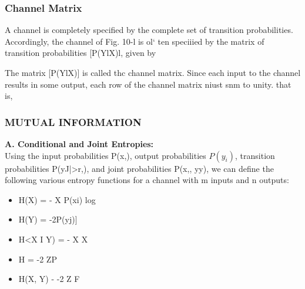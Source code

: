 \documentclass[a4]{beamer}
\begin{document}
\begin{frame}
\frametitle{ Channel Matrix}

A channel is completely specified by the complete set of transition probabilities. Accordingly, the
channel of Fig. 10-l is ol` ten speciiied by the matrix of transition probabilities [P(YlX)l, given by

The matrix [P(YlX)] is called thc channel matrix. Since each input to the channel results in some
output, each row of the channel matrix niust snm to unity. that is,
 \end{frame}


\begin{frame}
\frametitle{ MUTUAL INFORMATION}
\textbf{A. Conditional and Joint Entropies:}\\
Using the input probabilities P(x,), output probabilities $P(y_i)$, transition probabilities P(yJ|>r,),
and joint probabilities P(x,, yy), we can define the following various entropy functions for a channel
with m inputs and n outputs:
 
\begin{itemize}
\item H(X) = - X P(xi) log %
\item H(Y) = -2P(yj)]%
\item H<X I Y) = - X X %
\item H = -2 ZP%
\item H(X, Y) - -2 Z F%
\end{itemize}
\end{frame}
\end{document}
